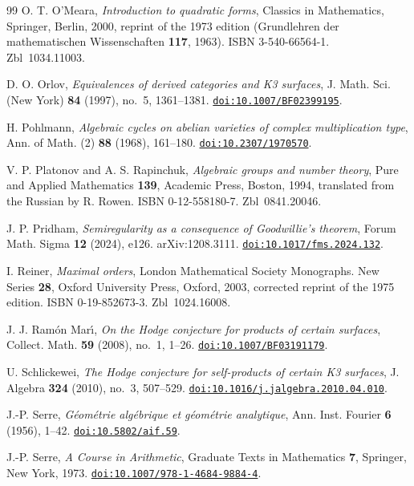 \begin{thebibliography}{99}
O. T. O'Meara,
\emph{Introduction to quadratic forms},
Classics in Mathematics, Springer, Berlin, 2000, reprint of the 1973 edition (Grundlehren der mathematischen Wissenschaften \textbf{117}, 1963). ISBN 3-540-66564-1. Zbl~1034.11003.

D. O. Orlov,
\emph{Equivalences of derived categories and K3 surfaces},
J. Math. Sci. (New York) \textbf{84} (1997), no.~5, 1361--1381.
\href{https://doi.org/10.1007/BF02399195}{\nolinkurl{doi:10.1007/BF02399195}}.

H. Pohlmann,
\emph{Algebraic cycles on abelian varieties of complex multiplication type},
Ann. of Math. (2) \textbf{88} (1968), 161--180.
\href{https://doi.org/10.2307/1970570}{\nolinkurl{doi:10.2307/1970570}}.

V. P. Platonov and A. S. Rapinchuk,
\emph{Algebraic groups and number theory},
Pure and Applied Mathematics \textbf{139}, Academic Press, Boston, 1994, translated from the Russian by R. Rowen. ISBN 0-12-558180-7. Zbl~0841.20046.

J. P. Pridham,
\emph{Semiregularity as a consequence of Goodwillie's theorem},
Forum Math. Sigma \textbf{12} (2024), e126. arXiv:1208.3111.
\href{https://doi.org/10.1017/fms.2024.132}{\nolinkurl{doi:10.1017/fms.2024.132}}.

I. Reiner,
\emph{Maximal orders},
London Mathematical Society Monographs. New Series \textbf{28}, Oxford University Press, Oxford, 2003, corrected reprint of the 1975 edition. ISBN 0-19-852673-3. Zbl~1024.16008.

J. J. Ram\'on Mar\'{\i},
\emph{On the Hodge conjecture for products of certain surfaces},
Collect. Math. \textbf{59} (2008), no.~1, 1--26.
\href{https://doi.org/10.1007/BF03191179}{\nolinkurl{doi:10.1007/BF03191179}}.

U. Schlickewei,
\emph{The Hodge conjecture for self-products of certain K3 surfaces},
J. Algebra \textbf{324} (2010), no.~3, 507--529.
\href{https://doi.org/10.1016/j.jalgebra.2010.04.010}{\nolinkurl{doi:10.1016/j.jalgebra.2010.04.010}}.

J.-P. Serre,
\emph{G\'eom\'etrie alg\'ebrique et g\'eom\'etrie analytique},
Ann. Inst. Fourier \textbf{6} (1956), 1--42.
\href{https://doi.org/10.5802/aif.59}{\nolinkurl{doi:10.5802/aif.59}}.

J.-P. Serre,
\emph{A Course in Arithmetic},
Graduate Texts in Mathematics \textbf{7}, Springer, New York, 1973.
\href{https://doi.org/10.1007/978-1-4684-9884-4}{\nolinkurl{doi:10.1007/978-1-4684-9884-4}}.


\end{thebibliography}

